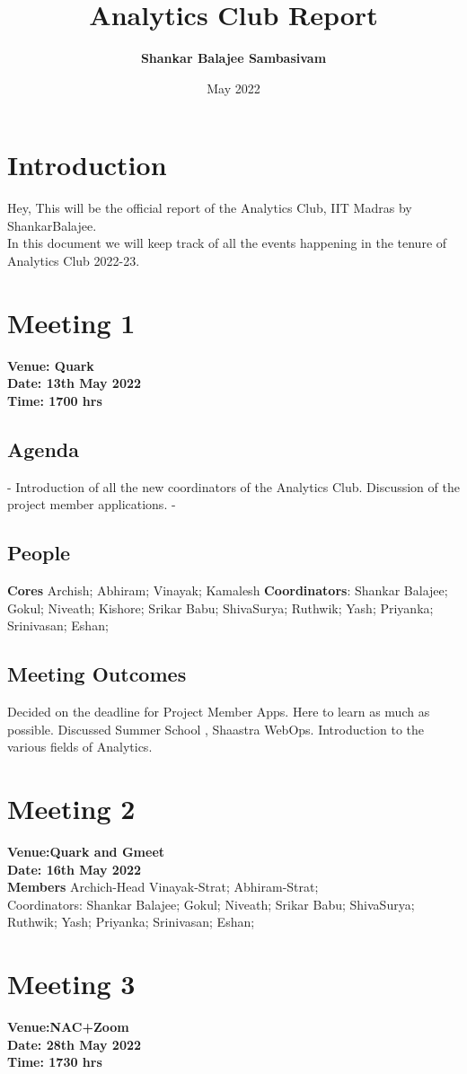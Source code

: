 \documentclass[11pt]{scrartcl}
\title{\textbf{Analytics Club Report}}
\author{\textbf{Shankar Balajee Sambasivam}}
\date{May 2022}
\begin{document}
\dylantitle

\section{Introduction}
Hey, This will be the official report of the Analytics Club, IIT Madras by ShankarBalajee.\\
In this document we will keep track of all the events happening in the tenure of Analytics Club 2022-23.\\
\section{Meeting 1}
\textbf{Venue: Quark}\\
\textbf{Date: 13th May 2022}\\
\textbf{Time: 1700 hrs}\\
\subsection{Agenda}
- Introduction of all the new coordinators of the Analytics Club. Discussion of the project member applications.
- 
\subsection{People}
\textbf{Cores} Archish; Abhiram; Vinayak; Kamalesh
\textbf{Coordinators}:
Shankar Balajee;
Gokul;
Niveath;
Kishore;
Srikar Babu;
ShivaSurya;
Ruthwik;
Yash;
Priyanka;
Srinivasan;
Eshan;
\subsection{Meeting Outcomes}
Decided on the deadline for Project Member Apps. Here to learn as much as possible. Discussed Summer School , Shaastra WebOps. Introduction to the various fields of Analytics.
\section{Meeting 2}
\textbf{Venue:Quark and Gmeet}\\
\textbf{Date: 16th May 2022}\\
\textbf{Members}
Archich-Head
Vinayak-Strat;
Abhiram-Strat;\\
Coordinators:
Shankar Balajee;
Gokul;
Niveath;
Srikar Babu;
ShivaSurya;
Ruthwik;
Yash;
Priyanka;
Srinivasan;
Eshan;

\section{Meeting 3}
\textbf{Venue:NAC+Zoom}\\
\textbf{Date: 28th May 2022}\\
\textbf{Time: 1730 hrs}\\
\end{document}
